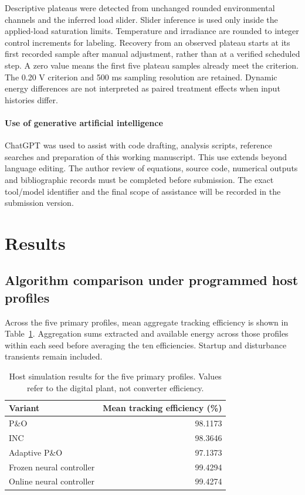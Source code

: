 \documentclass[Acad.Energy.,researcharticle,9pt,twoside,oneauthor]{Definitions/jams_academia}
\begin{document}
Descriptive plateaus were detected from unchanged rounded environmental channels and the inferred load slider. Slider inference is used only inside the applied-load saturation limits. Temperature and irradiance are rounded to integer control increments for labeling. Recovery from an observed plateau starts at its first recorded sample after manual adjustment, rather than at a verified scheduled step. A zero value means the first five plateau samples already meet the criterion. The 0.20 V criterion and 500 ms sampling resolution are retained. Dynamic energy differences are not interpreted as paired treatment effects when input histories differ.

\paragraph{Use of generative artificial intelligence}
ChatGPT was used to assist with code drafting, analysis scripts, reference searches and preparation of this working manuscript. This use extends beyond language editing. The author review of equations, source code, numerical outputs and bibliographic records must be completed before submission. The exact tool/model identifier and the final scope of assistance will be recorded in the submission version.

\section{Results}
\subsection{Algorithm comparison under programmed host profiles}
Across the five primary profiles, mean aggregate tracking efficiency is shown in Table~\ref{tab:host}. Aggregation sums extracted and available energy across those profiles within each seed before averaging the ten efficiencies. Startup and disturbance transients remain included.


\begin{table}[htbp]\caption{Host simulation results for the five primary profiles. Values refer to the digital plant, not converter efficiency.}\label{tab:host}\centering
\begin{tabular}{lr}\toprule Variant&Mean tracking efficiency (\%)\\\midrule
P\&O&98.1173\\ INC&98.3646\\ Adaptive P\&O&97.1373\\ Frozen neural controller&99.4294\\ Online neural controller&99.4274\\\bottomrule\end{tabular}\end{table}
\end{document}
